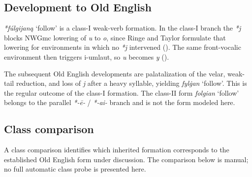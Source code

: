 \documentclass[
  british,
  a4paper,
  openany]{book}
\providecommand{\Recon}[1]{\emph{*#1}}
{\catcode`→=\active \global\def→{\ensuremath{\rightarrow}}}
\providecommand{\Recon}[1]{\emph{*#1}}
{\catcode`→=\active \global\def→{\ensuremath{\rightarrow}}}
\begin{document}
\subsection{Development to Old
English}\label{development-to-old-english-81}

{\Recon{fúlgijaną} `follow'} is a class-I weak-verb formation. In the
class-I branch the \emph{*j} blocks NWGmc lowering of \emph{u} to
\emph{o}, since Ringe and Taylor formulate that lowering for
environments in which no \emph{*j} intervened
(). The same
front-vocalic environment then triggers i-umlaut, so \emph{u} becomes
\emph{y} ().

The subsequent Old English developments are palatalization of the velar,
weak-tail reduction, and loss of \emph{j} after a heavy syllable,
yielding {\emph{fylġan}} `follow'. This is the regular outcome of the
class-I formation. The class-II form {\emph{folgian}} `follow' belongs
to the parallel \emph{*-ē-} / \emph{*-ai-} branch and is not the form
modeled here.

\subsection{Class comparison}\label{class-comparison-1}

A class comparison identifies which inherited formation corresponds to
the established Old English form under discussion. The comparison below
is manual; no full automatic class probe is presented here.
\end{document}
